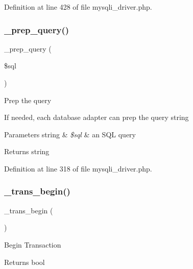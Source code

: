 Definition at line 428 of file mysqli\+\_\+driver.\+php.

\mbox{\label{class_c_i___d_b__mysqli__driver_a86af88ef0fa6d44ab4691e3f53270339}} 
\subsubsection{\texorpdfstring{\_prep\_query()}{\_prep\_query()}}
{\footnotesize\ttfamily \+\_\+prep\+\_\+query (\begin{DoxyParamCaption}\item[{}]{\$sql }\end{DoxyParamCaption})\hspace{0.3cm}{\ttfamily [protected]}}

Prep the query

If needed, each database adapter can prep the query string


\begin{DoxyParams}[1]{Parameters}
string & {\em \$sql} & an S\+QL query \\
\hline
\end{DoxyParams}
\begin{DoxyReturn}{Returns}
string 
\end{DoxyReturn}


Definition at line 318 of file mysqli\+\_\+driver.\+php.

\mbox{\label{class_c_i___d_b__mysqli__driver_ac81ac882c1d54347d810199a15856aac}} 
\subsubsection{\texorpdfstring{\_trans\_begin()}{\_trans\_begin()}}
{\footnotesize\ttfamily \+\_\+trans\+\_\+begin (\begin{DoxyParamCaption}{ }\end{DoxyParamCaption})\hspace{0.3cm}{\ttfamily [protected]}}

Begin Transaction

\begin{DoxyReturn}{Returns}
bool 
\end{DoxyReturn}


